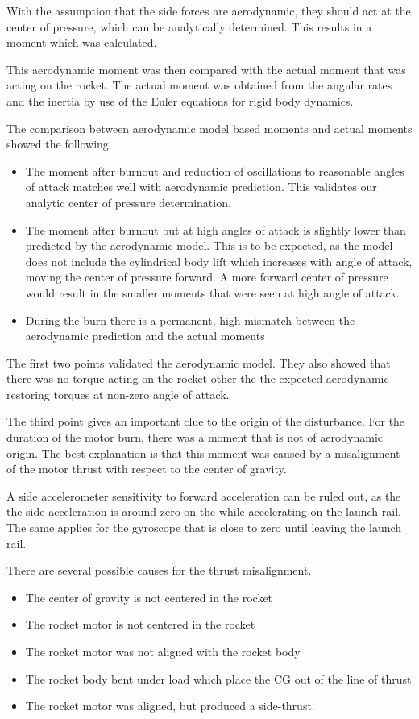 With the assumption that the side forces are aerodynamic, they should act at the center of pressure, which can be analytically determined.
This results in a moment which was calculated.

This aerodynamic moment was then compared with the actual moment that was acting on the rocket.
The actual moment was obtained from the angular rates and the inertia by use of the Euler equations for rigid body dynamics.

The comparison between aerodynamic model based moments and actual moments showed the following.
\begin{itemize}
\item The moment after burnout and reduction of oscillations to reasonable angles of attack matches well with aerodynamic prediction. This validates our analytic center of pressure determination.
\item The moment after burnout but at high angles of attack is slightly lower than predicted by the aerodynamic model. This is to be expected, as the model does not include the cylindrical body lift which increases with angle of attack, moving the center of pressure forward. A more forward center of pressure would result in the smaller moments that were seen at high angle of attack.
\item During the burn there is a permanent, high mismatch between the aerodynamic prediction and the actual moments
\end{itemize}

The first two points validated the aerodynamic model.
They also showed that there was no torque acting on the rocket other the the expected aerodynamic restoring torques at non-zero angle of attack.

The third point gives an important clue to the origin of the disturbance. For the duration of the motor burn, there was a moment that is not of aerodynamic origin.
The best explanation is that this moment was caused by a misalignment of the motor thrust with respect to the center of gravity.

A side accelerometer sensitivity to forward acceleration can be ruled out, as the the side acceleration is around zero on the while accelerating on the launch rail.
The same applies for the gyroscope that is close to zero until leaving the launch rail.

There are several possible causes for the thrust misalignment.
\begin{itemize}
    \item The center of gravity is not centered in the rocket
    \item The rocket motor is not centered in the rocket
    \item The rocket motor was not aligned with the rocket body
    \item The rocket body bent under load which place the CG out of the line of thrust
    \item The rocket motor was aligned, but produced a side-thrust.
\end{itemize}



